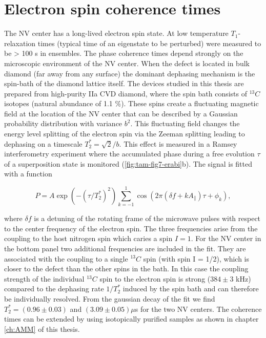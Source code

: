 \section{Electron spin coherence times}
\label{sec:elcohtimes}
The NV center has a long-lived electron spin state. At low temperature $T_1$-relaxation times (typical time of an eigenstate to be perturbed) were measured to be > 100 s in ensembles\cite{Jarmola_Phys.Rev.Lett._2012}. The phase coherence times depend strongly on the microscopic environment of the NV center. When the defect is located in bulk diamond (far away from any surface) the dominant dephasing mechanism is the spin-bath of the diamond lattice itself. The devices studied in this thesis are prepared from high-purity IIa CVD diamond, where the spin bath consists of $^{13}C$ isotopes (natural abundance of 1.1 $\%$). These spins create a fluctuating magnetic field at the location of the NV center that can be described by a Gaussian probability distribution with variance $b^2$. This fluctuating field changes the energy level splitting of the electron spin via the Zeeman splitting leading to dephasing on a timescale $T_2^{*} = \sqrt{2}/b$. This effect is measured in a Ramsey interferometry experiment where the accumulated phase during a free evolution $\tau$ of a superposition state is monitored (\ref{fig:tam-fig7-erabi}b). The signal is fitted with a function

\begin{equation}\label{eq:tam-ramsey}
P = A \exp(-(\tau/T_2^*)^2)\sum\limits_{k=-1}^1 \cos(2 \pi(\delta f +k A_{\parallel})\tau +\phi_k),
\end{equation}

where $\delta f$ is a detuning of the rotating frame of the microwave pulses with respect to the center frequency of the electron spin. The three frequencies arise from the coupling to the host nitrogen spin which caries a spin $I = 1$. For the NV center in the bottom panel two additional frequencies are included in the fit. They are associated with the coupling to a single $^{13}C$ spin (with spin I = 1/2), which is closer to the defect than the other spins in the bath. In this case the coupling strength of the individual $^{13}C$ spin to the electron spin is strong ($384 \pm 3$ kHz) compared to the dephasing rate $1/T_2^*$ induced by the spin bath and can therefore be individually resolved. From the gaussian decay of the fit we find $T_2^{*} = (0.96 \pm 0.03)$ and $(3.09 \pm 0.05) \mu$s for the two NV centers. The coherence times can be extended by using isotopically purified samples as shown in chapter \ref{ch:AMM} of this thesis. 

